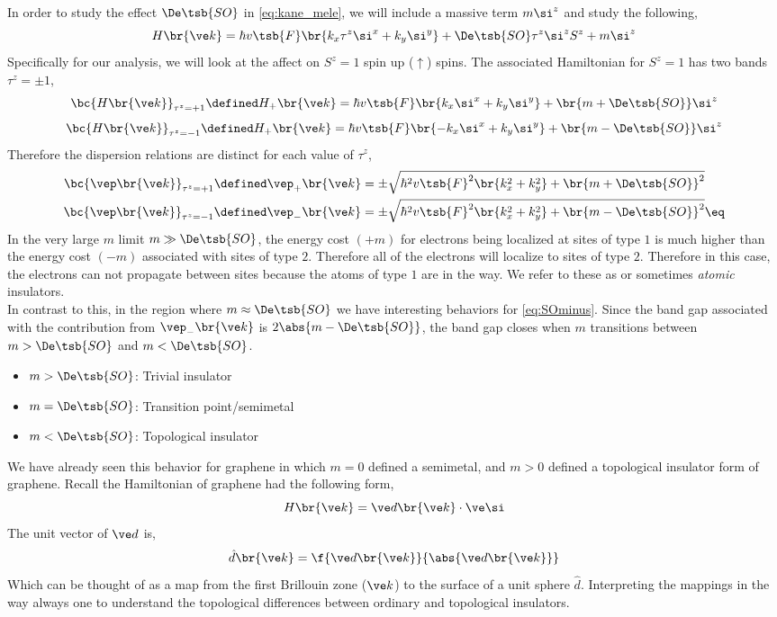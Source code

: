 \documentclass{article}
\begin{document}
In order to study the effect $\De\tsb{SO}$ in \cref{eq:kane_mele}, we will include a massive term $m \si^{z}$ and study the following,
\[ H\br{\ve k} =\hbar v\tsb{F} \br{k_x \tau^{z} \si^x + k_y \si^{y}} + \De\tsb{SO} \tau^{z} \si^{z} S^{z} + m \si^{z}\]
Specifically for our analysis, we will look at the affect on $S^{z} = 1$ spin up ($\uparrow$) spins. The associated Hamiltonian for $S^{z} = 1$ has two bands $\tau^{z} = \pm 1$,
\[ \bc{H\br{\ve k}}_{\tau^{z} = +1} \defined H_{+}\br{\ve k} =\hbar v\tsb{F} \br{k_x \si^x + k_y \si^{y}} + \br{m + \De\tsb{SO}} \si^{z}\]
\[ \bc{H\br{\ve k}}_{\tau^{z} = -1} \defined H_{+}\br{\ve k} =\hbar v\tsb{F} \br{-k_x \si^x + k_y \si^{y}} + \br{m - \De\tsb{SO}} \si^{z}\]
Therefore the dispersion relations are distinct for each value of $\tau^{z}$,
\begin{align*}
    \bc{\vep\br{\ve k}}_{\tau^{z} = +1}\defined \vep_{+}\br{\ve k} &= \pm\sqrt{\hbar^2 v\tsb{F}^2 \br{k_x^2 + k_y^2} + \br{m + \De\tsb{SO}}^2} \\
    \bc{\vep\br{\ve k}}_{\tau^{z} = -1}\defined \vep_{-}\br{\ve k} &= \pm\sqrt{\hbar^2 v\tsb{F}^2 \br{k_x^2 + k_y^2} + \br{m - \De\tsb{SO}}^2} \eq \label{eq:SOminus}
\end{align*}
In the very large $m$ limit $m \gg \De\tsb{SO}$, the energy cost $(+m)$ for electrons being localized at sites of type $1$ is much higher than the energy cost $(-m)$ associated with sites of type $2$. Therefore all of the electrons will localize to sites of type $2$. Therefore in this case, the electrons can not propagate between sites because the atoms of type $1$ are in the way. We refer to these as  or sometimes \textit{atomic} insulators. \\

In contrast to this, in the region where $m \approx \De\tsb{SO}$ we have interesting behaviors for \cref{eq:SOminus}. Since the band gap associated with the contribution from $\vep_{-}\br{\ve k}$ is $2 \abs{m - \De\tsb{SO}}$, the band gap closes when $m$ transitions between $m > \De\tsb{SO}$ and $m < \De\tsb{SO}$.
\begin{itemize}
    \item $m > \De\tsb{SO}$: Trivial insulator
    \item $m = \De\tsb{SO}$: Transition point/semimetal
    \item $m < \De\tsb{SO}$: Topological insulator
\end{itemize}
We have already seen this behavior for graphene in which $m=0$ defined a semimetal, and $m>0$ defined a topological insulator form of graphene. Recall the Hamiltonian of graphene had the following form,
\[ H\br{\ve k} = \ve d \br{\ve k} \cdot \ve \si \]
The unit vector of $\ve d$ is,
\[ \hat d \br{\ve k} = \f{\ve d \br{\ve k}}{\abs{\ve d \br{\ve k}}} \]
Which can be thought of as a map from the first Brillouin zone ($\ve k$) to the surface of a unit sphere $\hat d$. Interpreting the mappings in the way always one to understand the topological differences between ordinary and topological insulators. \\
\end{document}
